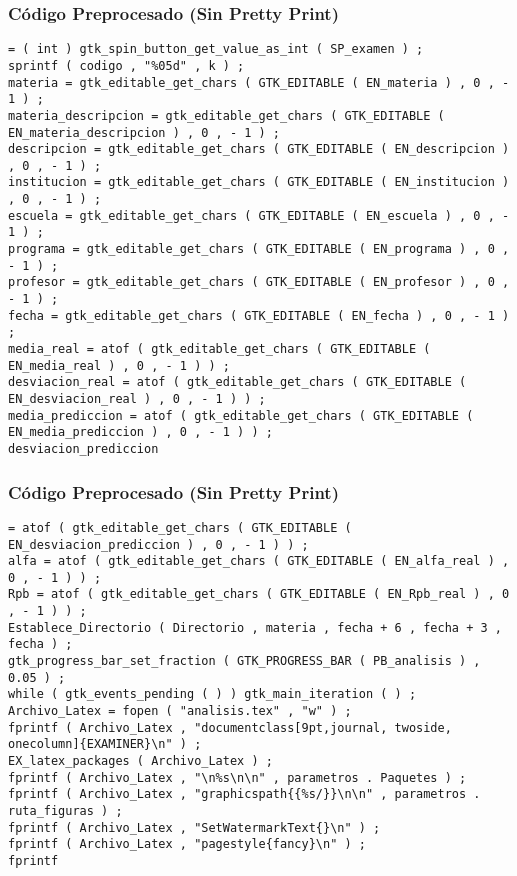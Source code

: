\documentclass{beamer}
\begin{document}
\begin{frame}[fragile]
\frametitle{C\'odigo Preprocesado (Sin Pretty Print)}
\begin{lstlisting}[style=CStyle]
= ( int ) gtk_spin_button_get_value_as_int ( SP_examen ) ; 
sprintf ( codigo , "%05d" , k ) ; 
materia = gtk_editable_get_chars ( GTK_EDITABLE ( EN_materia ) , 0 , - 1 ) ; 
materia_descripcion = gtk_editable_get_chars ( GTK_EDITABLE ( EN_materia_descripcion ) , 0 , - 1 ) ; 
descripcion = gtk_editable_get_chars ( GTK_EDITABLE ( EN_descripcion ) , 0 , - 1 ) ; 
institucion = gtk_editable_get_chars ( GTK_EDITABLE ( EN_institucion ) , 0 , - 1 ) ; 
escuela = gtk_editable_get_chars ( GTK_EDITABLE ( EN_escuela ) , 0 , - 1 ) ; 
programa = gtk_editable_get_chars ( GTK_EDITABLE ( EN_programa ) , 0 , - 1 ) ; 
profesor = gtk_editable_get_chars ( GTK_EDITABLE ( EN_profesor ) , 0 , - 1 ) ; 
fecha = gtk_editable_get_chars ( GTK_EDITABLE ( EN_fecha ) , 0 , - 1 ) ; 
media_real = atof ( gtk_editable_get_chars ( GTK_EDITABLE ( EN_media_real ) , 0 , - 1 ) ) ; 
desviacion_real = atof ( gtk_editable_get_chars ( GTK_EDITABLE ( EN_desviacion_real ) , 0 , - 1 ) ) ; 
media_prediccion = atof ( gtk_editable_get_chars ( GTK_EDITABLE ( EN_media_prediccion ) , 0 , - 1 ) ) ; 
desviacion_prediccion \end{lstlisting}
\end{frame}
\begin{frame}[fragile]
\frametitle{C\'odigo Preprocesado (Sin Pretty Print)}
\begin{lstlisting}[style=CStyle]
= atof ( gtk_editable_get_chars ( GTK_EDITABLE ( EN_desviacion_prediccion ) , 0 , - 1 ) ) ; 
alfa = atof ( gtk_editable_get_chars ( GTK_EDITABLE ( EN_alfa_real ) , 0 , - 1 ) ) ; 
Rpb = atof ( gtk_editable_get_chars ( GTK_EDITABLE ( EN_Rpb_real ) , 0 , - 1 ) ) ; 
Establece_Directorio ( Directorio , materia , fecha + 6 , fecha + 3 , fecha ) ; 
gtk_progress_bar_set_fraction ( GTK_PROGRESS_BAR ( PB_analisis ) , 0.05 ) ; 
while ( gtk_events_pending ( ) ) gtk_main_iteration ( ) ; 
Archivo_Latex = fopen ( "analisis.tex" , "w" ) ; 
fprintf ( Archivo_Latex , "documentclass[9pt,journal, twoside, onecolumn]{EXAMINER}\n" ) ; 
EX_latex_packages ( Archivo_Latex ) ; 
fprintf ( Archivo_Latex , "\n%s\n\n" , parametros . Paquetes ) ; 
fprintf ( Archivo_Latex , "graphicspath{{%s/}}\n\n" , parametros . ruta_figuras ) ; 
fprintf ( Archivo_Latex , "SetWatermarkText{}\n" ) ; 
fprintf ( Archivo_Latex , "pagestyle{fancy}\n" ) ; 
fprintf \end{lstlisting}
\end{frame}
\end{document}
